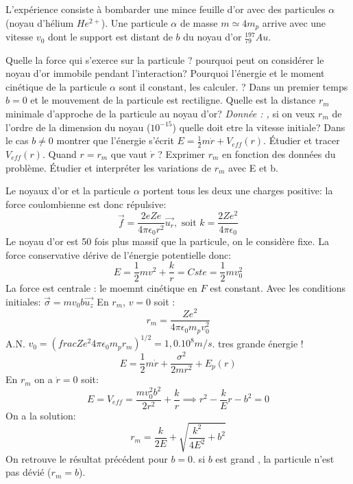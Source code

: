 \begin{Exercise}[title=(*) Diffusion de Rutherford]
	L'expérience consiste à bombarder une mince feuille d'or avec des particules
    $\alpha$ (noyau d'hélium $He^{2+}$). Une particule $\alpha$ de masse $m \simeq 4m_p$ arrive
    avec une vitesse $v_0$ dont le support est distant de $b$ du noyau d'or
    $^{197}_{79}Au$.

    \begin{center}
    \end{center}

    \Question Quelle la force qui s'exerce sur la particule ? pourquoi peut
    on considérer le noyau d'or immobile pendant l'interaction?
    \Question Pourquoi l'énergie et le moment cinétique de la particule $\alpha$ sont
    il constant, les calculer. ?
    \Question Dans un premier temps $b=0$ et le mouvement de la particule est
    rectiligne. Quelle est la distance $r_m$ minimale d'approche de la particule
    au noyau d'or?
    \emph{Donnée : ,}
	si on veux $r_m$ de l'ordre de la dimension du noyau ($10^{-15}$) quelle
    doit etre la vitesse initiale?
    \Question Dans le cas $b\neq 0$ montrer que l'énergie s'écrit $E=
    \frac{1}{2}m\dot{r}+V_{eff}(r)$. Étudier et tracer $V_{eff}(r)$. Quand
    $r=r_m$ que vaut $\dot{r}$ ? Exprimer $r_m$ en fonction des données du
    problème. Étudier et interpréter les variations de $r_m$ avec E et b.
\end{Exercise}
\begin{Answer}
  \Question Le noyaux d'or et la particule $\alpha$ portent tous les deux une charges positive: la force coulombienne est donc répulsive:
  \[
    \vec{f} = \frac{2eZe}{4\pi\epsilon_0r^2}\vec{u_r}, \text{ soit } k = \frac{2Ze^2}{4\pi\epsilon_0}
  \]
  Le noyau d'or est 50 fois plus massif que la particule, on le considère fixe.
  \Question La force conservative dérive de l'énergie potentielle donc:
  \[
    E= \frac{1}{2}mv^2+\frac{k}{r} = Cste = \frac{1}{2}mv_0^2
  \]
  La force est centrale : le moemnt cinétique en $F$ est constant. Avec les conditions initiales: $\vec{\sigma}= mv_0 b \vec{u_z}$
  \Question En $r_m$, $v=0$ soit :
  \[
    r_m = \frac{Ze^2}{4\pi\epsilon_0m_pv_0^2}
  \]
  A.N. $v_0 =\left(frac{Ze^2}{4\pi\epsilon_0m_pr_m}\right)^{1/2} =1,0.10^8 m/s$. tres grande énergie !
  \Question
  \[
    E = \frac{1}{2}m\dot{r} + \frac{\sigma^2}{2mr^2} +E_p(r) 
  \]
  En $r_m$ on a $\dot{r}=0$ soit:
  \[
    E = V_{eff} = \frac{mv_0^2b^2}{2r^2}+\frac{k}{r} \implies r^2-\frac{k}{E}r-b^2 = 0
  \]
  On a la solution:
  \[
    r_m = \frac{k}{2E}+\sqrt{\frac{k^2}{4E^2}+b^2}
  \]
  On retrouve le résultat précédent pour $b=0$. si $b$ est grand , la particule n'est pas dévié ($r_m=b$).
\end{Answer}
